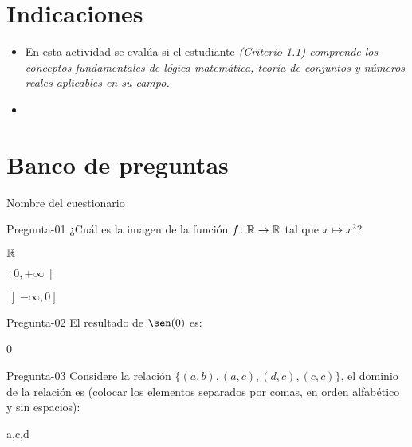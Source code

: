 \documentclass[a4,11pt]{aleph-notas}
\begin{document}
\encabezado

\vspace*{-8mm}
\section{Indicaciones}

\begin{itemize}[leftmargin=*]
\item 
    En esta actividad se evalúa si el estudiante \textit{(Criterio 1.1) comprende los conceptos fundamentales de lógica matemática, teoría de conjuntos y números reales aplicables en su campo.}
\item
    
\end{itemize}

\section{Banco de preguntas}

\begin{quiz}{Nombre del cuestionario}

\begin{multi}[%
    feedback={La respuesta correcta es $\left[0,+\infty\right[$}
    ]%
    {Pregunta-01}
    ¿Cuál es la imagen de la función $f\colon \mathbb{R} \rightarrow \mathbb{R}$ tal que $x\mapsto x^2$?
    \item $\mathbb{R}$
    \item* $\left[0,+\infty\right[$
    \item $\left]-\infty,0\right]$
\end{multi}

\begin{numerical}[tolerance=0.1,%
    feedback={Se tiene que $\sen(0)=1$.}
    ]%
    {Pregunta-02}
    El resultado de $\sen(0)$ es:
    \item 0
\end{numerical}

\begin{shortanswer}[%
    feedback={El dominio de la relación es $\{a,c,d\}$}
    ]%
    {Pregunta-03}
    Considere la relación $\{(a,b), (a,c), (d,c), (c,c)\}$, el dominio de la relación es (colocar los elementos separados por comas, en orden alfabético y sin espacios):
    \item a,c,d
\end{shortanswer}

\end{quiz}
\end{document}

